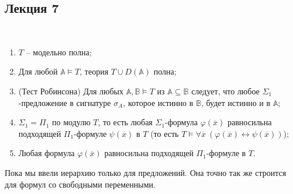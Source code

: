 \subsection{Лекция 7}

\begin{theorem} \  

    \begin{enumerate}
        \item $T$ -- модельно полна; 
        \item Для любой $\mathbb{A} \models T$, теория $T \cup D(\mathbb{A})$ полна; 
        \item (Тест Робинсона) Для любых $\mathbb{A}, \mathbb{B} \models T$ из $\mathbb{A} \subseteq \mathbb{B}$ следует, что любое $\Sigma_1$-предложение в сигнатуре $\sigma_A$, которое истинно в $\mathbb{B}$, будет истинно и в $\mathbb{A}$; 
        \item $\Sigma_1 = \Pi_1$ по модулю $T$, то есть любая $\Sigma_1$-формула $\varphi(\overline{x})$ равносильна подходящей $\Pi_1$-формуле $\psi(\overline{x})$ в $T$ (то есть $T \models \forall \overline{x}~(\varphi(\overline{x}) \leftrightarrow \psi (\overline{x}))$); 
        \item Любая формула $\varphi(\overline{x})$ равносильна подходящей $\Pi_1$-формуле в $T$.
    \end{enumerate}
\end{theorem}

\begin{remark}
    Пока мы ввели иерархию только для предложений. Она точно так же строится для формул со свободными переменными.
\end{remark}

